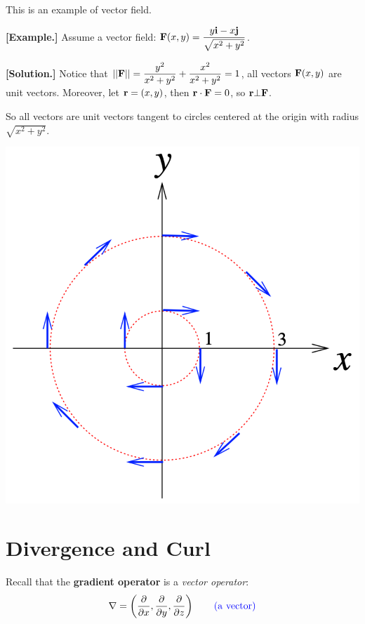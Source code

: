 \documentclass[11pt, a4paper]{MATH2023}
\newcommand{\eg}{\textbf{[Example.] }}
\newcommand{\sol}{\textbf{[Solution.] }}
\newcommand{\ii}{{\bf i}}
\newcommand{\jj}{{\bf j}}
\newcommand{\pt}{\partial}
\begin{document}
\begin{spacing}{1.3}
    \vspace{0.5in}
    {\blue This is an example of vector field.}

    \eg Assume a vector field: ${\bf F}(x,y)=\dfrac{y\ii -x\jj}{\sqrt{x^2+y^2}}$.

    \sol Notice that $||{\bf F}||=\dfrac{y^2}{x^2+y^2}+\dfrac{x^2}{x^2+y^2}=1$, all vectors 
    ${\bf F}(x,y)$ are unit vectors. Moreover, let ${\bf r}=(x,y)$, then ${\bf r}\cdot {\bf F}=0$,
    so ${\bf r}\bot {\bf F}$.

    So all vectors are unit vectors tangent to circles centered at the origin with radius $\sqrt{x^2+y^2}$.
    \begin{center}
        \includegraphics[scale=0.4]{images/Ch15-ex1.2.png}
    \end{center}

    \newpage
    \section{Divergence and Curl}

    Recall that the {\bf gradient operator} is a {\it vector operator}:
    $$\nabla =\left(\frac{\pt}{\pt x}, \frac{\pt}{\pt y}, \frac{\pt}{\pt z}\right)\qquad {\blue \rm (a\ vector)}$$


\end{spacing}
\end{document}
